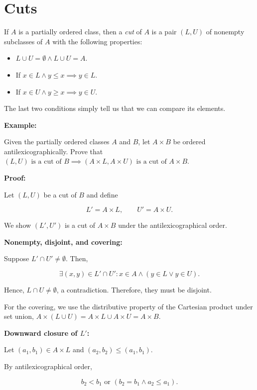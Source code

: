 \section{Cuts}

If \(A\) is a partially ordered class, then a \emph{cut} of \(A\) is a pair \((L, U)\) of nonempty subclasses of \(A\) with
the following properties:

\begin{itemize}

	\item \(L \cup U = \emptyset \land L \cup U = A\).
	\item If \(x \in L \land y \le x \implies y \in L\).
	\item If \(x \in U \land y \ge x \implies y \in U\).

\end{itemize}

The last two conditions simply tell us that we can compare its elements.

\textbf{Example:}

Given the partially ordered classes \(A\) and \(B\), let \(A \times B\) be ordered antilexicographically. Prove that
\((L, U) \text{ is a cut of } B \implies (A \times L, A \times U) \text{ is a cut of } A \times B\).

\textbf{Proof:}

Let \((L,U)\) be a cut of \(B\) and define

\[
	L' = A \times L, \qquad U' = A \times U.
\]

We show \((L',U')\) is a cut of \(A \times B\) under the antilexicographical order.

\textbf{Nonempty, disjoint, and covering:}

Suppose \(L' \cap U' \neq \emptyset\). Then,

\[
	\exists (x,y) \in L' \cap U': x \in A \land (y \in L \lor y \in U).
\]

Hence, \(L \cap U \neq \emptyset\), a contradiction. Therefore, they must be disjoint.

For the covering, we use the distributive property of the Cartesian product under set union,
\(A \times (L \cup U) = A \times L \cup A \times U = A \times B\).

\textbf{Downward closure of \(L'\):}

Let \((a_1,b_1) \in A \times L\) and \((a_2,b_2) \le (a_1,b_1)\).

By antilexicographical order,

\[
	b_2 < b_1 \text{ or } (b_2 = b_1 \land a_2 \le a_1).
\]

